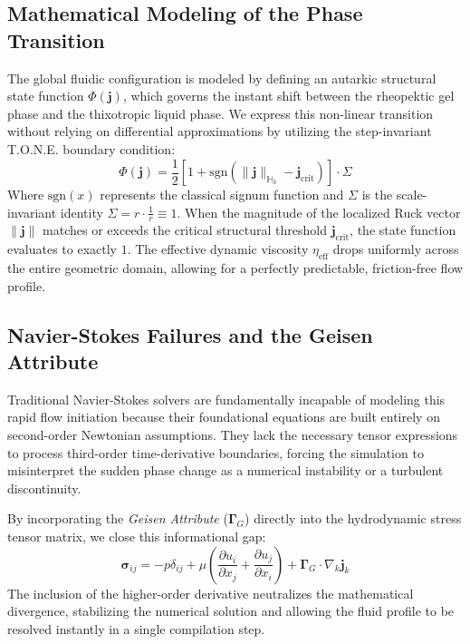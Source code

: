 \documentclass[11pt,a4paper]{article}
\begin{document}
\subsection{Mathematical Modeling of the Phase Transition}
The global fluidic configuration is modeled by defining an autarkic structural state function $\Phi(\mathbf{j})$, which governs the instant shift between the rheopektic gel phase and the thixotropic liquid phase. We express this non-linear transition without relying on differential approximations by utilizing the step-invariant T.O.N.E. boundary condition:
\begin{equation}
    \Phi(\mathbf{j}) = \frac{1}{2} \left[ 1 + \text{sgn}\left( \|\mathbf{j}\|_{\mathbb{H}_3} - \mathbf{j}_{\text{crit}} \right) \right] \cdot \Sigma
\end{equation}
Where $\text{sgn}(x)$ represents the classical signum function and $\Sigma$ is the scale-invariant identity $\Sigma = r \cdot \frac{1}{r} \equiv 1$. When the magnitude of the localized Ruck vector $\|\mathbf{j}\|$ matches or exceeds the critical structural threshold $\mathbf{j}_{\text{crit}}$, the state function evaluates to exactly $1$. The effective dynamic viscosity $\eta_{\text{eff}}$ drops uniformly across the entire geometric domain, allowing for a perfectly predictable, friction-free flow profile.

\subsection{Navier-Stokes Failures and the Geisen Attribute}
Traditional Navier-Stokes solvers are fundamentally incapable of modeling this rapid flow initiation because their foundational equations are built entirely on second-order Newtonian assumptions. They lack the necessary tensor expressions to process third-order time-derivative boundaries, forcing the simulation to misinterpret the sudden phase change as a numerical instability or a turbulent discontinuity.

By incorporating the \textit{Geisen Attribute} ($\mathbf{\Gamma}_G$) directly into the hydrodynamic stress tensor matrix, we close this informational gap:
\begin{equation}
    \mathbf{\sigma}_{ij} = -p\delta_{ij} + \mu \left( \frac{\partial u_i}{\partial x_j} + \frac{\partial u_j}{\partial x_i} \right) + \mathbf{\Gamma}_G \cdot \nabla_k \mathbf{j}_k
\end{equation}
The inclusion of the higher-order derivative neutralizes the mathematical divergence, stabilizing the numerical solution and allowing the fluid profile to be resolved instantly in a single compilation step.
\end{document}
